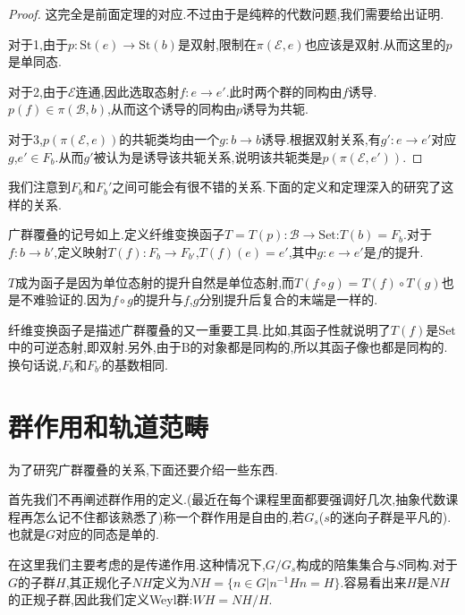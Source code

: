 \begin{proof}
    这完全是前面定理的对应.不过由于是纯粹的代数问题,我们需要给出证明.

    对于1,由于$p:\mathrm{St}(e) \to \mathrm{St}(b)$是双射,限制在$\pi(\mathcal{E},e)$也应该是双射.从而这里的$p$是单同态.

    对于2,由于$\mathcal{E}$连通,因此选取态射$f:e \to e'$.此时两个群的同构由$f$诱导.$p(f) \in \pi(\mathcal{B},b)$,从而这个诱导的同构由$p$诱导为共轭.

    对于3,$p(\pi(\mathcal{E},e))$的共轭类均由一个$g:b\to b$诱导.根据双射关系,有$g':e \to e'$对应$g$,$e' \in F_b$.从而$g'$被认为是诱导该共轭关系,说明该共轭类是$p(\pi(\mathcal{E},e'))$.
\end{proof}
 
我们注意到$F_b$和$F_b'$之间可能会有很不错的关系.下面的定义和定理深入的研究了这样的关系.
\begin{definition}
    广群覆叠的记号如上.定义纤维变换函子$T=T(p):\mathcal{B} \to \mathrm{Set}$:$T(b)=F_b$.对于$f:b \to b'$,定义映射$T(f):F_b \to F_{b'}$,$T(f)(e)=e'$,其中$g:e \to e'$是$f$的提升.

    $T$成为函子是因为单位态射的提升自然是单位态射,而$T(f\circ g)=T(f)\circ T(g)$也是不难验证的.因为$f \circ g$的提升与$f$,$g$分别提升后复合的末端是一样的.
\end{definition}
纤维变换函子是描述广群覆叠的又一重要工具.比如,其函子性就说明了$T(f)$是$\mathrm{Set}$中的可逆态射,即双射.另外,由于$\mathrm{B}$的对象都是同构的,所以其函子像也都是同构的.换句话说,$F_b$和$F_{b'}$的基数相同.
\section{群作用和轨道范畴}
为了研究广群覆叠的关系,下面还要介绍一些东西.

首先我们不再阐述群作用的定义.(最近在每个课程里面都要强调好几次,抽象代数课程再怎么记不住都该熟悉了)称一个群作用是自由的,若$G_s$($s$的迷向子群是平凡的).也就是$G$对应的同态是单的.

在这里我们主要考虑的是传递作用.这种情况下,$G/G_s$构成的陪集集合与$S$同构.对于$G$的子群$H$,其正规化子$NH$定义为$NH=\{n\in G|n^{-1}Hn=H\}$.容易看出来$H$是$NH$的正规子群,因此我们定义Weyl群:$WH=NH/H$.

